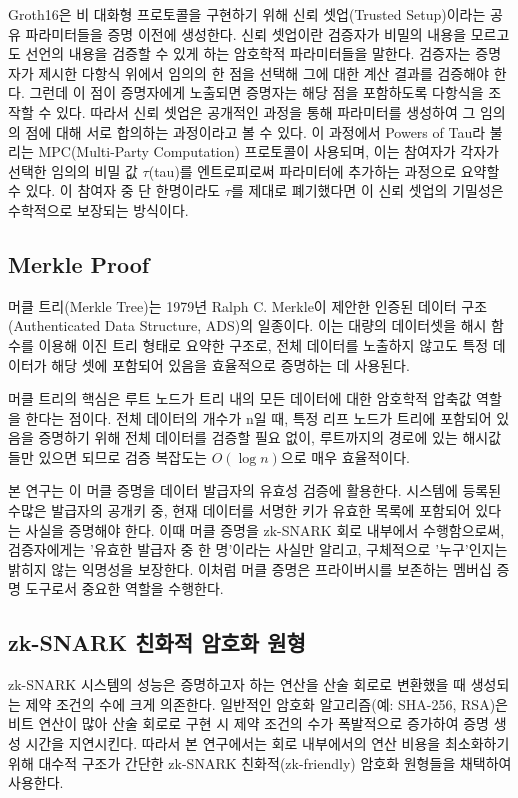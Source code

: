 \bigskip

Groth16은 비 대화형 프로토콜을 구현하기 위해 신뢰 셋업(Trusted Setup)이라는 공유 파라미터들을 증명 이전에 생성한다. 신뢰 셋업이란 검증자가 비밀의 내용을 모르고도 선언의 내용을 검증할 수 있게 하는 암호학적 파라미터들을 말한다. 검증자는 증명자가 제시한 다항식 위에서 임의의 한 점을 선택해 그에 대한 계산 결과를 검증해야 한다. 그런데 이 점이 증명자에게 노출되면 증명자는 해당 점을 포함하도록 다항식을 조 작할 수 있다. 따라서 신뢰 셋업은 공개적인 과정을 통해 파라미터를 생성하여 그 임의의 점에 대해 서로 합의하는 과정이라고 볼 수 있다. 이 과정에서 Powers of Tau라 불리는 MPC(Multi-Party Computation) 프로토콜이 사용되며, 이는 참여자가 각자가 선택한 임의의 비밀 값 $\tau$(tau)를 엔트로피로써 파라미터에 추가하는 과정으로 요약할 수 있다. 이 참여자 중 단 한명이라도 $\tau$를 제대로 폐기했다면 이 신뢰 셋업의 기밀성은 수학적으로 보장되는 방식이다.

\subsection{Merkle Proof}
머클 트리(Merkle Tree)는 1979년 Ralph C. Merkle이 제안한 인증된 데이터 구조(Authenticated Data Structure, ADS)의 일종이다. 이는 대량의 데이터셋을 해시 함수를 이용해 이진 트리 형태로 요약한 구조로, 전체 데이터를 노출하지 않고도 특정 데이터가 해당 셋에 포함되어 있음을 효율적으로 증명하는 데 사용된다.

\bigskip

머클 트리의 핵심은 루트 노드가 트리 내의 모든 데이터에 대한 암호학적 압축값 역할을 한다는 점이다. 전체 데이터의 개수가 n일 때, 특정 리프 노드가 트리에 포함되어 있음을 증명하기 위해 전체 데이터를 검증할 필요 없이, 루트까지의 경로에 있는 해시값들만 있으면 되므로 검증 복잡도는 $O(\log{n})$으로 매우 효율적이다.

\bigskip

본 연구는 이 머클 증명을 데이터 발급자의 유효성 검증에 활용한다. 시스템에 등록된 수많은 발급자의 공개키 중, 현재 데이터를 서명한 키가 유효한 목록에 포함되어 있다는 사실을 증명해야 한다. 이때 머클 증명을 zk-SNARK 회로 내부에서 수행함으로써, 검증자에게는 '유효한 발급자 중 한 명'이라는 사실만 알리고, 구체적으로 '누구'인지는 밝히지 않는 익명성을 보장한다. 이처럼 머클 증명은 프라이버시를 보존하는 멤버십 증명 도구로서 중요한 역할을 수행한다.

\subsection{zk-SNARK 친화적 암호화 원형}
zk-SNARK 시스템의 성능은 증명하고자 하는 연산을 산술 회로로 변환했을 때 생성되는 제약 조건의 수에 크게 의존한다. 일반적인 암호화 알고리즘(예: SHA-256, RSA)은 비트 연산이 많아 산술 회로로 구현 시 제약 조건의 수가 폭발적으로 증가하여 증명 생성 시간을 지연시킨다. 따라서 본 연구에서는 회로 내부에서의 연산 비용을 최소화하기 위해 대수적 구조가 간단한 zk-SNARK 친화적(zk-friendly) 암호화 원형들을 채택하여 사용한다.

